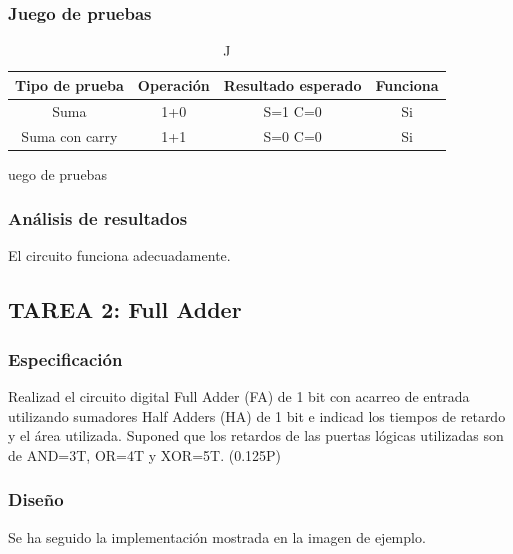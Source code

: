 \documentclass{article}
\begin{document}
		\subsubsection*{Juego de pruebas}
		
		\begin{table}[h]
			\begin{center}
				\begin{tabular}{| c | c | c | c |}
					\hline
					Tipo de prueba & Operación & Resultado esperado & Funciona \\ \hline
					
					Suma & 1+0 & S=1 C=0 & Si \\ \hline
					Suma con carry & 1+1 & S=0 C=0 & Si \\ \hline
				\end{tabular}
				\caption Juego de pruebas
			\end{center}
		\end{table}

		\subsubsection*{Análisis de resultados}
		El circuito funciona adecuadamente.


	\subsection{TAREA 2: Full Adder}
		\subsubsection*{Especificación}
		Realizad el circuito digital Full Adder (FA) de 1 bit con acarreo de entrada utilizando
		sumadores Half Adders (HA) de 1 bit e indicad los tiempos de retardo y el área utilizada. Suponed
		que los retardos de las puertas lógicas utilizadas son de AND=3T, OR=4T y XOR=5T. (0.125P)

		\subsubsection*{Diseño}
		Se ha seguido la implementación mostrada en la imagen de ejemplo.
\end{document}
